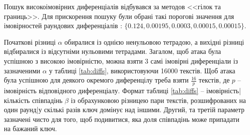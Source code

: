 \documentclass[12pt,a4paper]{article}
\begin{document}
Пошук високоімовірних диференціалів відбувався за методов <<гілок та границь>>. 
Для прискорення пошуку були обрані такі порогові значення для імовірностей раундових диференціалів : $\{ 0.124, 0.00195, 0.0003, 0.00015, 0.00015 \}$.\par
Початкові різниці $\alpha$ обиралися із однією ненульовою тетрадою, а вихідні різниці відбиралися із відсутніми нульовими тетрадами. Загалом, щоб атака була успішною з високою імовірністю, можна взяти 3 самі імовірні диференціали із зазначеними $\alpha$ у таблиці \ref{tab:diffs}, використовуючи 16000 текстів. Щоб атака була успішною для деякого окремого диференцілу треба взяти $\frac{16}{p}$ текстів, де $p$ -- імовірність відповідного диференціалу.
Формат таблиці \ref{tab:diffs} -- {імовірність|кількість співпадінь $\beta$ із обрахунковою різницею пари текстів, розшифрованих на один раунд|у скількі разів ключ домінує над іншими}. Другий, та третій параметр зазначені чисто для того, щоб подивитися, яка доля співпадінь може припадати на бажаний ключ.
\end{document}
